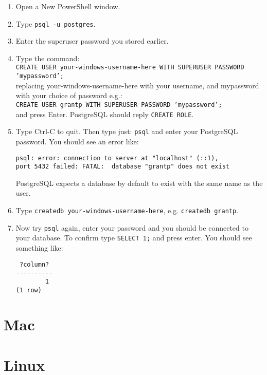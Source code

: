 \begin{enumerate}

\item
	Open a New PowerShell window.

\item
	Type \texttt{psql -u postgres}.
	
\item
	Enter the superuser password you stored earlier.
	
\item 
	Type the command:\\
	\texttt{CREATE USER your-windows-username-here WITH SUPERUSER PASSWORD 'mypassword';}\\
	replacing your-windows-username-here with your username, and mypassword with your choice of password e.g.:\\
	\texttt{CREATE USER grantp WITH SUPERUSER PASSWORD 'mypassword';}\\
	and press Enter.
	PostgreSQL should reply \texttt{CREATE ROLE}.

\item
	Type Ctrl-C to quit.
	Then type just:
	\texttt{psql}
	and enter your PostgreSQL password.
	You should see an error like:
\begin{verbatim}
psql: error: connection to server at "localhost" (::1),
port 5432 failed: FATAL:  database "grantp" does not exist
\end{verbatim}
	PostgreSQL expects a database by default to exist with the same name as the user.

\item
	Type \texttt{createdb your-windows-username-here}, e.g.
	\texttt{createdb grantp}.
	
\item 
	Now try \texttt{psql} again, enter your password and you should be connected to your database.
	To confirm type \texttt{SELECT 1;} and press enter.
	You should see something like:
\begin{verbatim}
 ?column?
----------
        1
(1 row)
\end{verbatim}

\end{enumerate}


\section{Mac}
\label{sec:postgresql-setup-mac}

\section{Linux}
\label{sec:postgresql-setup-linux}

